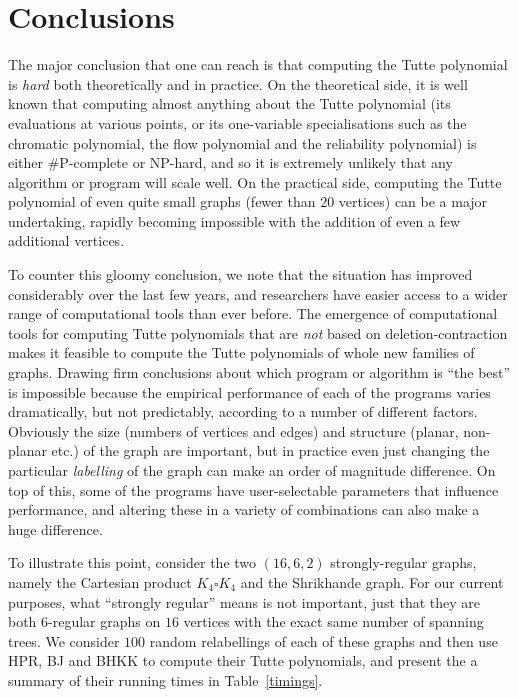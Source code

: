 

\section{Conclusions}  

The major conclusion that one can reach is that computing the Tutte polynomial is \emph{hard} both theoretically and in 
practice. On the theoretical side, it is well known that computing almost anything about the Tutte polynomial (its evaluations at various points, or its one-variable specialisations such as the chromatic polynomial, the flow polynomial and the reliability polynomial) is either \#P-complete or NP-hard, and so it is extremely unlikely that any algorithm or program will scale well. On the practical side, computing the Tutte polynomial of even quite small graphs (fewer than $20$ vertices) can be a major undertaking, rapidly becoming impossible with the addition of even a few additional vertices.

To counter this gloomy conclusion, we note that the situation has improved considerably over the last few years, and researchers 
have easier access to a wider range of computational tools than ever before. The emergence of computational tools for computing
Tutte polynomials that are \emph{not} based on deletion-contraction makes it feasible to compute the Tutte polynomials of
whole new families of graphs.   Drawing firm conclusions about which program or algorithm is ``the best'' is impossible because the empirical performance of each of the programs varies dramatically, but not predictably, according to a number of different factors. Obviously the size (numbers of vertices and edges) and structure (planar, non-planar etc.) of the graph are important, but in practice even just changing the particular {\em labelling} of the graph can make an order of magnitude difference. On top of this, some of the programs have user-selectable parameters that influence performance, and altering these in a variety of combinations can also make a huge difference.

To illustrate this point, consider the two $(16,6,2)$ strongly-regular graphs, namely the Cartesian product $K_4 \square K_4$ and
the Shrikhande graph. For our current purposes, what ``strongly regular'' means is not important, just that they are both $6$-regular graphs on $16$ vertices with the exact same number of spanning trees. We consider $100$ random relabellings of 
each of these graphs and then use HPR, BJ and BHKK to compute their Tutte polynomials, and present the
a summary of their running times in Table~\ref{timings}. 

